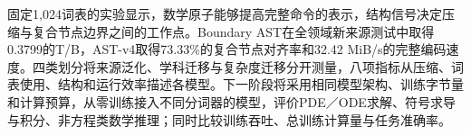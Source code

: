 固定1,024词表的实验显示，数学原子能够提高完整命令的表示，结构信号决定压缩与复合节点边界之间的工作点。Boundary AST在全领域新来源测试中取得0.3799的T/B，AST-v4取得73.33\%的复合节点对齐率和32.42 MiB/s的完整编码速度。四类划分将来源泛化、学科迁移与复杂度迁移分开测量，八项指标从压缩、词表使用、结构和运行效率描述各模型。下一阶段将采用相同模型架构、训练字节量和计算预算，从零训练接入不同分词器的模型，评价PDE／ODE求解、符号求导与积分、非方程类数学推理；同时比较训练吞吐、总训练计算量与任务准确率。
